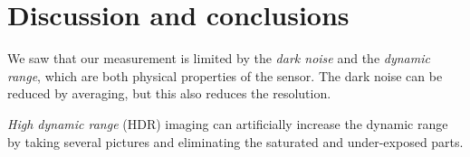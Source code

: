 \documentclass[a4paper, 12pt]{paper}
\begin{document}
\section{Discussion and conclusions}
We saw that our measurement is limited by the \emph{dark noise} and the \emph{dynamic range}, which are both physical properties of the sensor.
The dark noise can be reduced by averaging, but this also reduces the resolution.

\emph{High dynamic range} (HDR) imaging can artificially increase the dynamic range by taking several pictures and eliminating the saturated and under-exposed parts.
\end{document}
